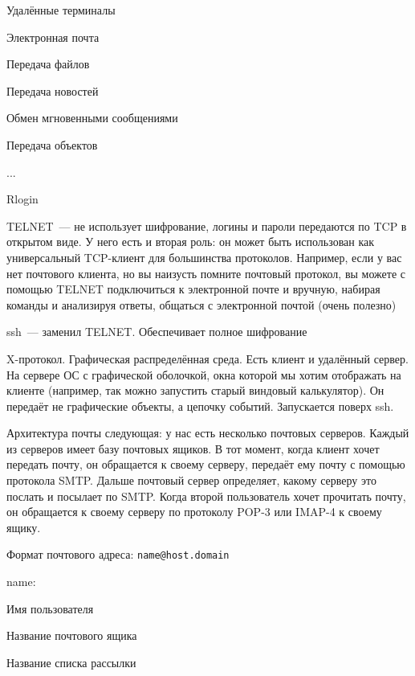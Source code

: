 
\begin{MyItemize}
    \item Удалённые терминалы
    \item Электронная почта
    \item Передача файлов
    \item Передача новостей
    \item Обмен мгновенными сообщениями
    \item Передача объектов
    \item ...
\end{MyItemize}


\begin{MyItemize}
    \item Rlogin
    \item TELNET~--- не использует шифрование, логины и пароли передаются по TCP в открытом виде. У него есть и вторая роль: он может быть использован как универсальный TCP-клиент для большинства протоколов. Например, если у вас нет почтового клиента, но вы наизусть помните почтовый протокол, вы можете с помощью TELNET подключиться к электронной почте и вручную, набирая команды и анализируя ответы, общаться с электронной почтой (очень полезно)
    \item ssh~--- заменил TELNET. Обеспечивает полное шифрование
    \item X-протокол. Графическая распределённая среда. Есть клиент и удалённый сервер. На сервере ОС с графической оболочкой, окна которой мы хотим отображать на клиенте (например, так можно запустить старый виндовый калькулятор). Он передаёт не графические объекты, а цепочку событий. Запускается поверх ssh.
\end{MyItemize}


Архитектура почты следующая: у нас есть несколько почтовых серверов. Каждый из серверов имеет базу почтовых ящиков. В тот момент, когда клиент хочет передать почту, он обращается к своему серверу, передаёт ему почту с помощью протокола SMTP. Дальше почтовый сервер определяет, какому серверу это послать и посылает по SMTP. Когда второй пользователь хочет прочитать почту, он обращается к своему серверу по протоколу POP-3 или IMAP-4 к своему ящику.

Формат почтового адреса: {\tt name@host.domain}
\begin{MyItemize}
    \item name:
    \begin{MyItemize}
        \item Имя пользователя
        \item Название почтового ящика
        \item Название списка рассылки
    \end{MyItemize}
\end{MyItemize}

